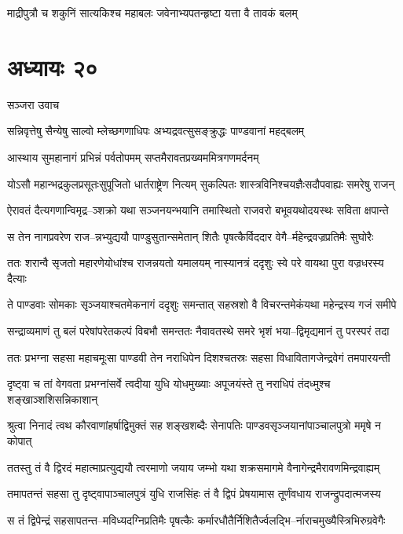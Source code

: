 \twolineshloka
{माद्रीपुत्रौ च शकुनिं सात्यकिश्च महाबलः}
{जवेनाभ्यपतन्हृष्टा यत्ता वै तावकं बलम्}


\chapter{अध्यायः २०}
\twolineshloka
{सञ्जरा उवाच}
{}


\twolineshloka
{सन्निवृत्तेषु सैन्येषु साल्वो म्लेच्छगणाधिपः}
{अभ्यद्रवत्सुसङ्क्रुद्धः पाण्डवानां महद्बलम्}


\twolineshloka
{आस्थाय सुमहानागं प्रभिन्नं पर्वतोपमम्}
{सप्तमैरावतप्रख्यममित्रगणमर्दनम्}


\twolineshloka
{योऽसौ महान्भद्रकुलप्रसूतःसुपूजितो धार्तराष्ट्रेण नित्यम्}
{सुकल्पितः शास्त्रविनिश्चयज्ञैःसदौपवाह्यः समरेषु राजन्}


\twolineshloka
{ऐरावतं दैत्यगणान्विमृद्र--ञ्शक्रो यथा सञ्जनयन्भयानि}
{तमास्थितो राजवरो बभूवयथोदयस्थः सविता क्षपान्ते}


\twolineshloka
{स तेन नागप्रवरेण राज--न्नभ्युद्ययौ पाण्डुसुतान्समेतान्}
{शितैः पृषत्कैर्विददार वेगै--र्महेन्द्रवज्रप्रतिमैः सुघोरैः}


\twolineshloka
{ततः शरान्वै सृजतो महारणेयोधांश्च राजन्नयतो यमालयम्}
{नास्यानत्रं ददृशुः स्वे परे वायथा पुरा वज्रधरस्य दैत्याः}


\twolineshloka
{ते पाण्डवाः सोमकाः सृञ्जयाश्चतमेकनागं ददृशुः समन्तात्}
{सहस्रशो वै विचरन्तमेकंयथा महेन्द्रस्य गजं समीपे}


\twolineshloka
{सन्द्राव्यमाणं तु बलं परेषांपरेतकल्पं विबभौ समन्ततः}
{नैवावतस्थे समरे भृशं भया--द्विमृद्यमानं तु परस्परं तदा}


\twolineshloka
{ततः प्रभग्ना सहसा महाचमूःसा पाण्डवी तेन नराधिपेन}
{दिशश्चतस्रः सहसा विधावितागजेन्द्रवेगं तमपारयन्ती}


\twolineshloka
{दृष्ट्वा च तां वेगवता प्रभग्नांसर्वे त्वदीया युधि योधमुख्याः}
{अपूजयंस्ते तु नराधिपं तंदध्मुश्च शङ्खाञ्शशिसन्निकाशान्}


\twolineshloka
{श्रुत्वा निनादं त्वथ कौरवाणांहर्षाद्विमुक्तं सह शङ्खशब्दैः}
{सेनापतिः पाण्डवसृञ्जयानांपाञ्चालपुत्रो ममृषे न कोपात्}


\twolineshloka
{ततस्तु तं वै द्विरदं महात्माप्रत्युद्ययौ त्वरमाणो जयाय}
{जम्भो यथा शक्रसमागमे वैनागेन्द्रमैरावणमिन्द्रवाह्यम्}


\twolineshloka
{तमापतन्तं सहसा तु दृष्ट्वापाञ्चालपुत्रं युधि राजसिंहः}
{तं वै द्विपं प्रेषयामास तूर्णंवधाय राजन्द्रुपदात्मजस्य}


\twolineshloka
{स तं द्विपेन्द्रं सहसापतन्त--मविध्यदग्निप्रतिमैः पृषत्कैः}
{कर्मारधौतैर्निशितैर्ज्वलद्भि--र्नाराचमुख्यैस्त्रिभिरुग्रवेगैः}


